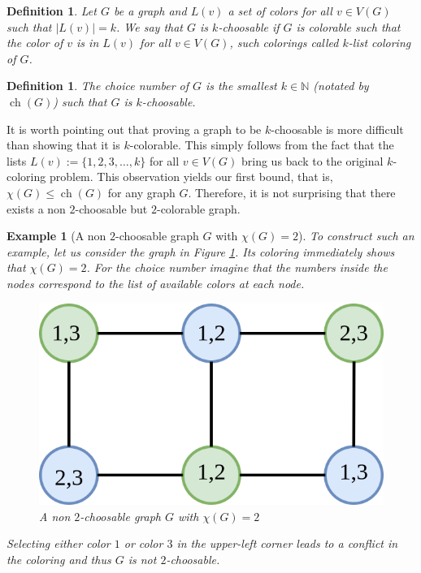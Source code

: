 \documentclass[a4paper, 12pt]{article}
\newtheorem{defin}[lem]{Definition}
\newtheorem{example}[lem]{Example}
\DeclareMathOperator*{\ch}{ch}
\begin{document}
\begin{defin} Let $G$ be a graph and $L(v)$ a set of colors for all $v \in V(G)$ such that $|L(v)|=k$. We say that $G$ is $k$\textit{-choosable} if $G$ is colorable such that the color of $v$ is in $L(v)$ for all $v \in V(G)$, such colorings called $k$\textit{-list coloring} of $G$.
\end{defin}
\begin{defin} The \textit{choice number} of $G$ is the smallest $k \in \mathbb{N}$ (notated by $\ch(G)$) such that $G$ is $k$-choosable.
\end{defin}
It is worth pointing out that proving a graph to be $k$-choosable is more difficult than showing that it is $k$-colorable. This simply follows from the fact that the lists $L(v):=\lbrace 1,2,3,\ldots,k\rbrace$ for all $v \in V(G)$ bring us back to the original $k$-coloring problem. This observation yields our first bound, that is, $\chi(G) \leqslant \ch(G)$ for any graph $G$. Therefore, it is not surprising that there exists a non $2$-choosable but $2$-colorable graph.
\begin{example}[A non $2$-choosable graph $G$ with $\chi(G)=2$]\label{ex:2-colorable-ch3}
To construct such an example, let us consider the graph in Figure \ref{fig:2-colorable-ch3}. Its coloring immediately shows that $\chi(G)=2$. For the choice number imagine that the numbers inside the nodes correspond to the list of available colors at each node.
\begin{figure}[!h]
\centering
\includegraphics[scale=0.3]{figures/2-colorable-3ch.png}
\caption{A non $2$-choosable graph $G$ with $\chi(G)=2$}\label{fig:2-colorable-ch3}
\end{figure}
Selecting either color $1$ or color $3$ in the upper-left corner leads to a conflict in the coloring and thus $G$ is not $2$-choosable.
\end{example}
\end{document}
